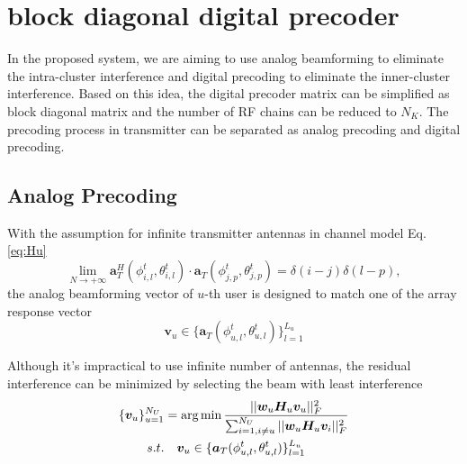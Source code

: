\documentclass[conference]{IEEEtran}
\def\argmin{\mathop{\mbox{arg\,min}}}
\begin{document}
\section{block diagonal digital precoder}
In the proposed system, we are aiming to use analog beamforming to eliminate the intra-cluster interference and digital precoding to eliminate the inner-cluster interference. Based on this idea, the digital precoder matrix can be simplified as block diagonal matrix and the number of RF chains can be reduced to $N_K$. The precoding process in transmitter can be separated as analog precoding and digital precoding.

\subsection{Analog Precoding }
With the assumption for infinite transmitter antennas in channel model Eq. \eqref{eq:Hu}
\begin{equation}
\lim_{N\rightarrow +\infty} \bm{a}^H_{T}(\phi^t_{i,l},\theta^t_{i,l}) \cdot\bm{a}_{T}(\phi^t_{j,p},\theta^t_{j,p})=\delta(i-j)\delta(l-p),
\end{equation}
the analog beamforming vector of $u$-th user is designed to match one of the array response vector
\begin{equation}
	\bm{v}_u \in \{ \bm{a}_{T}(\phi^t_{u,l},\theta^t_{u,l})\}_{l=1}^{L_u}
\end{equation}

Although it's impractical to use infinite number of antennas, the residual interference can be minimized by selecting the beam with least interference
\begin{align}\label{eq:analogprecoder}
\{\bm{v}_u\}_{u=1}^{N_U} &= \argmin \frac{||\bm{w}_u \bm{H}_u \bm{v}_u||_F^2}{\sum_{i=1,i\neq u}^{N_U}||\bm{w}_u \bm{H}_u \bm{v}_i||_F^2}  \\ \nonumber
s.t. &\quad \bm{v}_u \in \{ \bm{a}_{T}(\phi^t_{u,l},\theta^t_{u,l})\}_{l=1}^{L_u}
\end{align}
\end{document}
